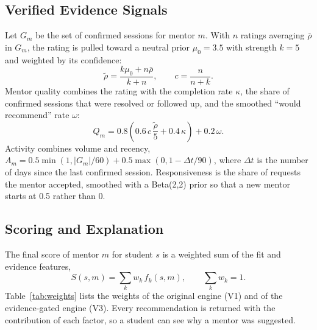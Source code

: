 \documentclass[12pt,a4paper]{report}
\begin{document}
\subsection{Verified Evidence Signals}
Let $G_m$ be the set of confirmed sessions for mentor $m$. With $n$ ratings averaging $\bar\rho$ in $G_m$, the rating is pulled toward a neutral prior $\mu_0 = 3.5$ with strength $k = 5$ and weighted by its confidence:
\begin{equation}
\tilde\rho = \frac{k\mu_0 + n\bar\rho}{k+n}, \qquad c = \frac{n}{n+k}.
\end{equation}
Mentor quality combines the rating with the completion rate $\kappa$, the share of confirmed sessions that were resolved or followed up, and the smoothed ``would recommend'' rate $\omega$:
\begin{equation}
Q_m = 0.8\left(0.6\,c\,\frac{\tilde\rho}{5} + 0.4\,\kappa\right) + 0.2\,\omega .
\end{equation}
Activity combines volume and recency, $A_m = 0.5\min(1, |G_m|/60) + 0.5\max(0, 1 - \Delta t/90)$, where $\Delta t$ is the number of days since the last confirmed session. Responsiveness is the share of requests the mentor accepted, smoothed with a Beta(2,2) prior so that a new mentor starts at 0.5 rather than 0.

\subsection{Scoring and Explanation}
The final score of mentor $m$ for student $s$ is a weighted sum of the fit and evidence features,
\begin{equation}
S(s,m) = \sum_{k} w_k\, f_k(s,m), \qquad \sum_k w_k = 1 .
\end{equation}
Table~\ref{tab:weights} lists the weights of the original engine (V1) and of the evidence-gated engine (V3). Every recommendation is returned with the contribution of each factor, so a student can see why a mentor was suggested.
\end{document}
